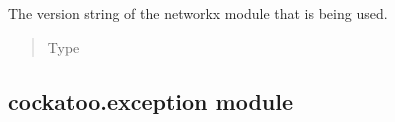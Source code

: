\documentclass[letterpaper,10pt,english]{sphinxmanual}
\begin{document}
\begin{fulllineitems}
\label{\detokenize{cockatoo:cockatoo.environment.NXVERSION}}
The version string of the networkx module that is being used.
\begin{quote}\begin{description}
\item[{Type}] \leavevmode
{}

\end{description}\end{quote}

\end{fulllineitems}



\subsection{cockatoo.exception module}
\label{\detokenize{cockatoo:module-cockatoo.exception}}\label{\detokenize{cockatoo:cockatoo-exception-module}}
\end{document}
